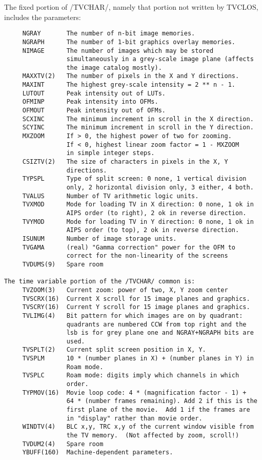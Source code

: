 The fixed portion of /TVCHAR/, namely that portion not written by
TVCLOS, includes the parameters:
\begin{verbatim}
     NGRAY       The number of n-bit image memories.
     NGRAPH      The number of 1-bit graphics overlay memories.
     NIMAGE      The number of images which may be stored
                 simultaneously in a grey-scale image plane (affects
                 the image catalog mostly).
     MAXXTV(2)   The number of pixels in the X and Y directions.
     MAXINT      The highest grey-scale intensity = 2 ** n - 1.
     LUTOUT      Peak intensity out of LUTs.
     OFMINP      Peak intensity into OFMs.
     OFMOUT      Peak intensity out of OFMs.
     SCXINC      The minimum increment in scroll in the X direction.
     SCYINC      The minimum increment in scroll in the Y direction.
     MXZOOM      If > 0, the highest power of two for zooming.
                 If < 0, highest linear zoom factor = 1 - MXZOOM
                 in simple integer steps.
     CSIZTV(2)   The size of characters in pixels in the X, Y
                 directions.
     TYPSPL      Type of split screen: 0 none, 1 vertical division
                 only, 2 horizontal division only, 3 either, 4 both.
     TVALUS      Number of TV arithmetic logic units.
     TVXMOD      Mode for loading TV in X direction: 0 none, 1 ok in
                 AIPS order (to right), 2 ok in reverse direction.
     TVYMOD      Mode for loading TV in Y direction: 0 none, 1 ok in
                 AIPS order (to top), 2 ok in reverse direction.
     ISUNUM      Number of image storage units.
     TVGAMA      (real) "Gamma correction" power for the OFM to
                 correct for the non-linearity of the screens
     TVDUMS(9)   Spare room

The time variable portion of the /TVCHAR/ common is:
     TVZOOM(3)   Current zoom: power of two, X, Y zoom center
     TVSCRX(16)  Current X scroll for 15 image planes and graphics.
     TVSCRY(16)  Current Y scroll for 15 image planes and graphics.
     TVLIMG(4)   Bit pattern for which images are on by quadrant:
                 quadrants are numbered CCW from top right and the
                 lsb is for grey plane one and NGRAY+NGRAPH bits are
                 used.
     TVSPLT(2)   Current split screen position in X, Y.
     TVSPLM      10 * (number planes in X) + (number planes in Y) in
                 Roam mode.
     TVSPLC      Roam mode: digits imply which channels in which
                 order.
     TYPMOV(16)  Movie loop code: 4 * (magnification factor - 1) +
                 64 * (number frames remaining). Add 2 if this is the
                 first plane of the movie.  Add 1 if the frames are
                 in "display" rather than movie order.
     WINDTV(4)   BLC x,y, TRC x,y of the current window visible from
                 the TV memory.  (Not affected by zoom, scroll!)
     TVDUM2(4)   Spare room
     YBUFF(160)  Machine-dependent parameters.
\end{verbatim}
